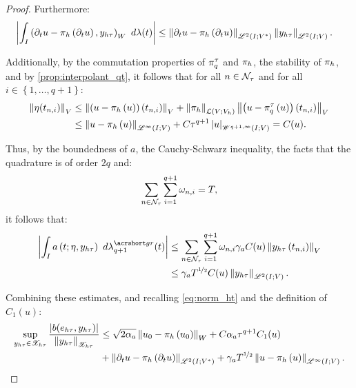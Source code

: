 \begin{proof}
    Furthermore:
    \begin{align*}
        \left\lvert \int_I \left( \partial_t u - \pi_h \left( \partial_t u \right), y_{h \tau}\right)_W ~ d \lambda(t) \right\rvert &\leq \left\lVert  \partial_t u - \pi_h \left( \partial_t u \right)  \right\rVert_{\mathscr{L}^{2}(I; V^*)} \left\lVert  y_{h \tau}  \right\rVert_{\mathscr{L}^{2}(I; V)}.
    \end{align*}

    Additionally, by the commutation properties of $\pi^{\tau}_q$ and $\pi_h$, the stability of $\pi_h$, and by \cref{prop:interpolant_qt}, it follows that for all $n \in \mathcal{N}_{\tau}$ and for all $i \in \left\{ 1, \dots, q + 1\right\}$:
    \begin{align*}
        \left\lVert  \eta(t_{n, i})  \right\rVert_V &\leq \left\lVert  \left( u - \pi_h \left( u \right) \right) \left( t_{n, i} \right)  \right\rVert_V + \left\lVert  \pi_h  \right\rVert_{\mathcal{L} \left(V; V_h \right)} \left\lVert  \left( u - \pi^{\tau}_q \left( u \right) \right) \left( t_{n, i} \right)  \right\rVert_V \\
        &\leq \left\lVert  u - \pi_h \left( u \right)  \right\rVert_{\mathscr{L}^{\infty}(I; V)} + C \tau^{q + 1} \left\lvert  u  \right\rvert_{\mathscr{W}^{q + 1, \infty}(I; V)} = C(u).
    \end{align*}

    Thus, by the boundedness of $a$, the Cauchy-Schwarz inequality, the facts that the quadrature is of order $2q$ and:
    \begin{align*}
        \sum_{n \in \mathcal{N}_{\tau}} \sum_{i = 1}^{q + 1} \omega_{n, i} = T,
    \end{align*}
    it follows that:
    \begin{align*}
        \left\lvert \int_I a \left( t; \eta, y_{h \tau}\right) ~ d \lambdaGR_{q + 1}(t) \right\rvert &\leq \sum_{n \in \TimeIndices} \sum_{i = 1}^{q + 1} \omega_{n, i} \ContC{a} C(u) \Norm{ y_{h \tau} \left( t_{n, i} \right)}_V \\
        &\leq \ContC{a} T^{\nicefrac12} C(u) \Norm{ y_{h \tau} }_{\SpaceLp{2}(I; V)}.
    \end{align*}

    Combining these estimates, and recalling \cref{eq:norm_ht} and the definition of $C_1(u)$:
    \begin{align*}
        \sup_{y_{h \tau} \in \mathscr{X}_{h \tau}} \frac{ \left\lvert b(e_{h \tau}, y_{h \tau}) \right\rvert }{\left\lVert y_{h \tau} \right\rVert_{\mathscr{X}_{h \tau}}} &\leq \sqrt{2 \alpha_{a}} \left\lVert  u_0 - \pi_h \left( u_0 \right)  \right\rVert_W + C \alpha_{a} \tau^{q + 1} C_1(u) \\
        &+ \left\lVert  \partial_t u - \pi_h \left( \partial_t u \right)  \right\rVert_{\mathscr{L}^{2}(I; V^*)} + \gamma_{a} T^{\nicefrac12} \left\lVert  u - \pi_h \left( u \right)  \right\rVert_{\mathscr{L}^{\infty}(I; V)}.
    \end{align*}


\end{proof}
